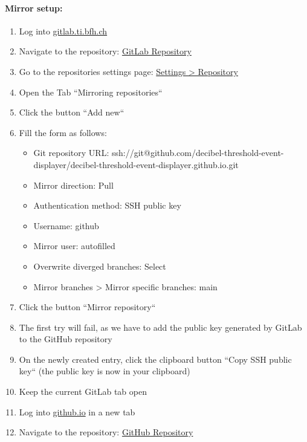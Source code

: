 \paragraph{Mirror setup:}
\begin{enumerate}
    \item Log into \href{https://gitlab.ti.bfh.ch}{gitlab.ti.bfh.ch}
    \item Navigate to the repository: \href{https://gitlab.ti.bfh.ch/decibel-threshold-event-displayer/decibel-threshold-event-displayer/}{GitLab Repository}
    \item Go to the repositories settings page: \href{https://gitlab.ti.bfh.ch/decibel-threshold-event-displayer/decibel-threshold-event-displayer/-/settings/repository}{Settings > Repository}
    \item Open the Tab ``Mirroring repositories``
    \item Click the button ``Add new``
    \item Fill the form as follows:
    \begin{itemize}
        \item Git repository URL: ssh://git@github.com/decibel-threshold-event-displayer/decibel-threshold-event-displayer.github.io.git
        \item Mirror direction: Pull
        \item Authentication method: SSH public key
        \item Username: github
        \item Mirror user: autofilled
        \item Overwrite diverged branches: Select
        \item Mirror branches > Mirror specific branches: main
    \end{itemize}
    \item Click the button ``Mirror repository``
    \item The first try will fail, as we have to add the public key generated by GitLab to the GitHub repository
    \item On the newly created entry, click the clipboard button ``Copy SSH public key`` (the public key is now in your clipboard)
    \item Keep the current GitLab tab open
    \item Log into \href{https://github.com/}{github.io} in a new tab
    \item Navigate to the repository: \href{https://github.com/decibel-threshold-event-displayer/decibel-threshold-event-displayer.github.io/}{GitHub Repository}

\end{enumerate}
